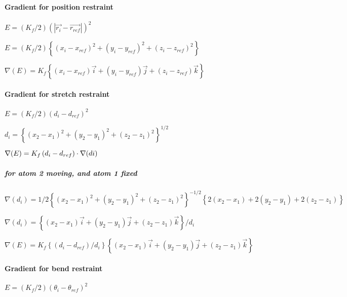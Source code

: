 \paragraph*{Gradient for position restraint}

$E=\left( K_{f}/2\right) \left( \left| \overrightarrow{r_{i}}-%
\overrightarrow{r_{ref}}\right| \right) ^{2}$

$E=\left( K_{f}/2\right) \left\{ \left( x_{i}-x_{ref}\right) ^{2}+\left(
y_{i}-y_{ref}\right) ^{2}+\left( z_{i}-z_{ref}\right) ^{2}\right\} $

$\nabla (E)=K_{f}\left\{ \left( x_{i}-x_{ref}\right) \overrightarrow{i}%
+\left( y_{i}-y_{ref}\right) \overrightarrow{j}+\left( z_{i}-z_{ref}\right) 
\overrightarrow{k}\right\} $

\paragraph*{Gradient for stretch restraint}

$E=\left( K_{f}/2\right) \left( d_{i}-d_{ref}\right) ^{2}$

$d_{i}=\left\{ \left( x_{2}-x_{1}\right) ^{2}+\left( y_{2}-y_{1}\right)
^{2}+\left( z_{2}-z_{1}\right) ^{2}\right\} ^{1/2}$

$\nabla (E)=K_{f}\left( d_{i}-d_{ref}\right) \cdot \nabla (di)\medskip $

\subparagraph*{for atom 2 moving, and atom 1 fixed}

$\nabla (d_{i})=1/2\left\{ \left( x_{2}-x_{1}\right) ^{2}+\left(
y_{2}-y_{1}\right) ^{2}+\left( z_{2}-z_{1}\right) ^{2}\right\}
^{-1/2}\left\{ 2\left( x_{2}-x_{1}\right) +2\left( y_{2}-y_{1}\right)
+2\left( z_{2}-z_{1}\right) \right\} $

$\nabla (d_{i})=\left\{ \left( x_{2}-x_{1}\right) \overrightarrow{i}+\left(
y_{2}-y_{1}\right) \overrightarrow{j}+\left( z_{2}-z_{1}\right) 
\overrightarrow{k}\right\} /d_{i}$

$\nabla (E)=K_{f}\left\{ \left( d_{i}-d_{ref}\right) /d_{i}\right\} \left\{
\left( x_{2}-x_{1}\right) \overrightarrow{i}+\left( y_{2}-y_{1}\right) 
\overrightarrow{j}+\left( z_{2}-z_{1}\right) \overrightarrow{k}\right\} $

\paragraph*{Gradient for bend restraint}

$E=\left( K_{f}/2\right) \left( \theta _{i}-\theta _{ref}\right) ^{2}$

